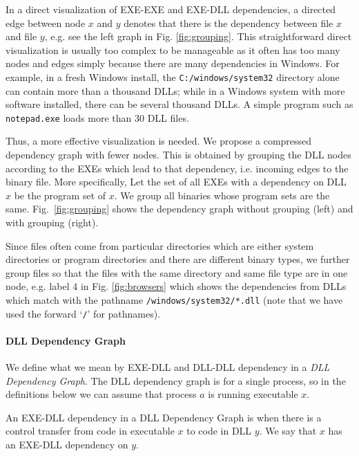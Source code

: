 In a direct visualization of EXE-EXE and EXE-DLL dependencies,
a directed edge between node $x$ and $y$ denotes that there is
the dependency between file $x$ and file $y$,
e.g. see the left graph in Fig. \ref{fig:grouping}.
This straightforward direct visualization is usually too complex
to be manageable as it often has too many nodes and edges simply
because there are many dependencies in Windows.
For example, in a fresh Windows install,
the {\tt C:/windows/system32} directory alone can contain more
than a thousand DLLs; while in a Windows system with more software installed,
there can be several thousand DLLs.
A simple program such as {\tt notepad.exe} loads more than 30 DLL files.

Thus, a more effective visualization is needed.
We propose a compressed dependency graph with fewer nodes.
This is obtained by grouping the DLL nodes according to the
EXEs which lead to that dependency,
i.e. incoming edges to the binary file.
More specifically, Let the set of all EXEs with a dependency on DLL $x$
be the program set of $x$.
We group all binaries whose program sets are the same.
Fig.~\ref{fig:grouping} shows the dependency graph without grouping (left) and
with grouping (right).

Since files often come from particular directories which are either system
directories or program directories and there are different binary types,
we further group files so that the files with the same directory and
same file type are in one node, e.g. label 4 in Fig. \ref{fig:browsers}
which shows the dependencies from DLLs which match with the
pathname {\tt /windows/system32/*.dll} (note that we have used
the forward `{\tt /}' for pathnames).

\paragraph{DLL Dependency Graph}

We define what we mean by EXE-DLL and DLL-DLL dependency in
a {\em DLL Dependency Graph}. The DLL dependency graph
is for a single process, so in the definitions below
we can assume that process $a$ is running executable $x$.

\begin{definition}
An EXE-DLL dependency in a DLL Dependency Graph
is when there is a control transfer from code in executable $x$
to code in DLL $y$.
We say that $x$ has an EXE-DLL dependency on $y$.
\end{definition}

